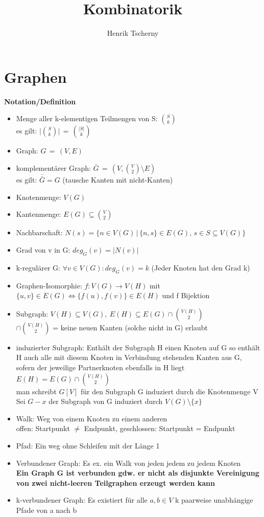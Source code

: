 \documentclass[12pt,a4paper]{article}
\title{Kombinatorik}
\author{Henrik Tscherny}
\begin{document}
\maketitle
\tableofcontents

\section{Graphen}
\textbf{Notation/Definition}\\
\begin{itemize}
\item Menge aller k-elementigen Teilmengen von S: $\binom{S}{k}$\\
es gilt: $\bigl | \binom{S}{k} \bigl | \, = \, \binom{\vert S \vert}{k}$
\item Graph: $G \,=\, (V,E)$
\item komplementärer Graph: $\bar{G} \, = \, (V, \binom{V}{2} \setminus E)$\\
es gilt: $\bar{\bar{G}} = G$ (tausche Kanten mit nicht-Kanten)
\item Knotenmenge: $V(G)$
\item Kantenmenge: $E(G) \subseteq \binom{V}{2}$
\item Nachbarschaft: $N(s) = \{n \in V(G) \,\vert\, \{n,s\} \in  E(G),\, s\in S\subseteq V(G) \}$
\item Grad von v in G: $deg_G(v) = |N(v)|$
\item k-regulärer G: $\forall v\in V(G): deg_G(v) = k$ (Jeder Knoten hat den Grad k)
\item Graphen-Isomorphie: $f: V(G) \rightarrow V(H)$ mit\\
$\{u,v\} \in E(G) \Leftrightarrow \{f(u),f(v)\} \in E(H)$ und f Bijektion
\item Subgraph: $V(H) \subseteq V(G), \: E(H) \subseteq E(G) \cap \binom{V(H)}{2}$\\
$\cap \binom{V(H)}{2}$ = keine neuen Kanten (solche nicht in G) erlaubt
\item induzierter Subgraph: Enthält der Subgraph H einen Knoten auf G so enthält H auch alle mit diesem Knoten in Verbindung stehenden Kanten aus G, sofern der jeweilige Partnerknoten ebenfalls in H liegt\\
$E(H) = E(G) \cap \binom{V(H)}{2}$\\
man schreibt $G[V]$ für den Subgraph G induziert durch die Knotenmenge V\\
Sei $G-x$ der Subgraph von G induziert durch $V(G)\setminus\{x\}$
\item Walk: Weg von einem Knoten zu einem anderen\\
offen: Startpunkt $\neq$ Endpunkt, geschlossen: Startpunkt = Endpunkt
\item Pfad: Ein weg ohne Schleifen mit der Länge 1
\item Verbundener Graph: Es ex. ein Walk von jeden jedem zu jedem Knoten\\
\textbf{Ein Graph G ist verbunden gdw. er nicht als disjunkte Vereinigung von zwei nicht-leeren Teilgraphen erzeugt werden kann}
\item k-verbundener Graph: Es existiert für alle $a,b \in V$ k paarweise unabhängige Pfade von a nach b
\end{itemize}
\end{document}
